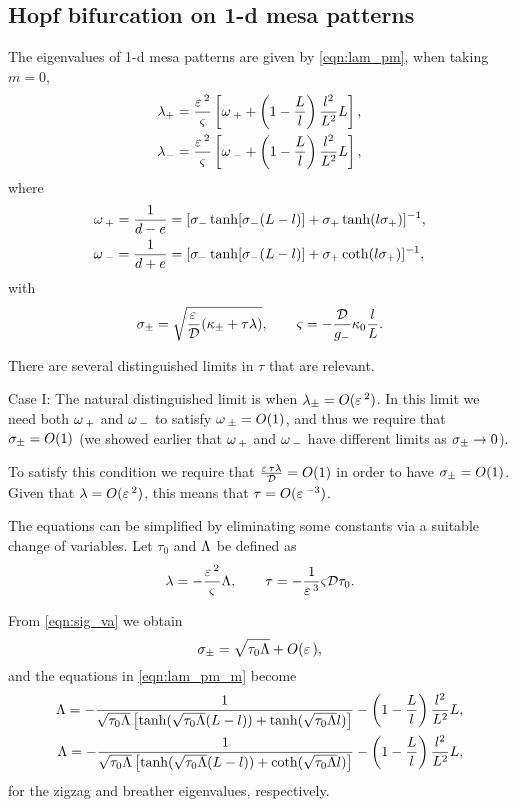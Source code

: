 \subsection{Hopf bifurcation on 1-d mesa patterns}
\label{sec:hopf}

The eigenvalues of 1-d mesa patterns are given by \eqref{eqn:lam_pm}, when taking $m=0$,
% 
\begin{equation}
\begin{split}
\label{eqn:lam_pm_m}
  \lambda_+ &= \frac{\varepsilon\,^2}{\varsigma}\left[\omega\,_+ + \left(1-\frac{L}{l} \right)\frac{l^2}{L^2}L\right],\\
  \lambda_- &= \frac{\varepsilon\,^2}{\varsigma}\left[\omega\,_- + \left(1-\frac{L}{l} \right)\frac{l^2}{L^2}L\right],
\end{split}
\end{equation}
% 
where
%
\[
  \begin{split}
    \omega\,_+ &= \frac{1}{d-e} = [\sigma_-\tanh[\sigma_-(L-l)]+\sigma_+\tanh(l\sigma_+)]^{-1},\\
	\omega\,_- &= \frac{1}{d+e} = [\sigma_-\tanh[\sigma_-(L-l)]+\sigma_+\coth(l\sigma_+)]^{-1},\\
  \end{split}
\]
% 
with 
% 
\begin{equation}
\label{eqn:sig_va}
  \sigma_{\pm} = \sqrt{\frac{\varepsilon\,}{\mathcal{D}}(\kappa_{\pm}+\tau\lambda)},\qquad \varsigma = -\frac{\mathcal{D}}{g_-}\kappa_0\frac{l}{L}.
\end{equation}
% 

\begin{remark}
  There are several distinguished limits in $\tau$ that are relevant.
\end{remark}

Case I: The natural distinguished limit is when $\lambda_{\pm} = O(\varepsilon\,^2)$. In this limit we need both $\omega\,_+$ and $\omega\,_-$ to satisfy $\omega\,_{\pm}=O(1)$, and thus we require that $\sigma_{\pm} = O(1)$  (we showed earlier that $\omega\,_+$ and $\omega\,_-$ have different limits as $\sigma_{\pm}\rightarrow0$). 

To satisfy this condition we require that $\frac{\varepsilon\,\tau\lambda}{\mathcal{D}}=O(1)$ in order to have $\sigma_{\pm}=O(1)$. Given that $\lambda=O(\varepsilon\,^2)$, this means that $\tau=O(\varepsilon\,^{-3})$.

The equations can be simplified by eliminating some constants via a suitable change of variables. Let $\tau_0$ and $\Lambda$ be defined as 
% 
\[
  \lambda=-\frac{\varepsilon\,^2}{\varsigma}\Lambda,\qquad \tau = -\frac{1}{\varepsilon\,^3}\varsigma\mathcal{D}\tau_0.
\]
% 

From \eqref{eqn:sig_va} we obtain
% 
\[
  \sigma_{\pm} = \sqrt{\tau_0\Lambda} + O(\varepsilon\,),
\]
% 
and the equations in \eqref{eqn:lam_pm_m} become
% 
\[
\begin{split}
  \Lambda = -\frac{1}{\sqrt{\tau_0\Lambda}\left[\tanh(\sqrt{\tau_0\Lambda}(L-l)) + \tanh(\sqrt{\tau_0\Lambda}l) \right]} - \left(1-\frac{L}{l}\right)\frac{l^2}{L^2}L ,\\
  \Lambda = -\frac{1}{\sqrt{\tau_0\Lambda}\left[\tanh(\sqrt{\tau_0\Lambda}(L-l)) + \coth(\sqrt{\tau_0\Lambda}l) \right]} - \left(1-\frac{L}{l}\right)\frac{l^2}{L^2}L ,
\end{split}
\]
% 
for the zigzag and breather eigenvalues, respectively.

